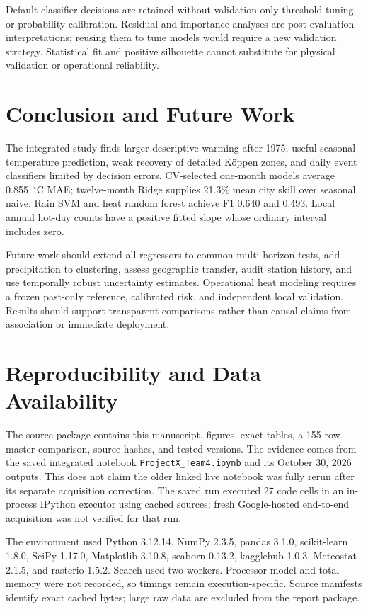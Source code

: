 \documentclass[conference]{IEEEtran}
\begin{document}
Default classifier decisions are retained without validation-only threshold tuning or probability calibration. Residual and importance analyses are post-evaluation interpretations; reusing them to tune models would require a new validation strategy. Statistical fit and positive silhouette cannot substitute for physical validation or operational reliability.

\section{Conclusion and Future Work}
The integrated study finds larger descriptive warming after 1975, useful seasonal temperature prediction, weak recovery of detailed K\"oppen zones, and daily event classifiers limited by decision errors. CV-selected one-month models average 0.855~$^\circ$C MAE; twelve-month Ridge supplies 21.3\% mean city skill over seasonal naive. Rain SVM and heat random forest achieve F1 0.640 and 0.493. Local annual hot-day counts have a positive fitted slope whose ordinary interval includes zero.

Future work should extend all regressors to common multi-horizon tests, add precipitation to clustering, assess geographic transfer, audit station history, and use temporally robust uncertainty estimates. Operational heat modeling requires a frozen past-only reference, calibrated risk, and independent local validation. Results should support transparent comparisons rather than causal claims from association or immediate deployment.

\section*{Reproducibility and Data Availability}
The source package contains this manuscript, figures, exact tables, a 155-row master comparison, source hashes, and tested versions. The evidence comes from the saved integrated notebook \texttt{ProjectX\_Team4.ipynb} and its October 30, 2026 outputs. This does not claim the older linked live notebook was fully rerun after its separate acquisition correction. The saved run executed 27 code cells in an in-process IPython executor using cached sources; fresh Google-hosted end-to-end acquisition was not verified for that run.

The environment used Python 3.12.14, NumPy 2.3.5, pandas 3.1.0, scikit-learn 1.8.0, SciPy 1.17.0, Matplotlib 3.10.8, seaborn 0.13.2, kagglehub 1.0.3, Meteostat 2.1.5, and rasterio 1.5.2. Search used two workers. Processor model and total memory were not recorded, so timings remain execution-specific. Source manifests identify exact cached bytes; large raw data are excluded from the report package.
\end{document}
